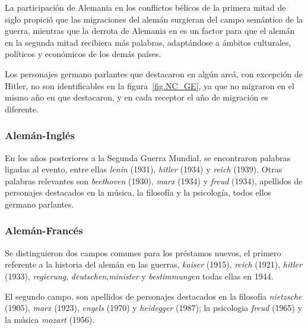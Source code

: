 La participación de Alemania en los conflictos bélicos de la primera mitad de siglo  propició que las migraciones del alemán surgieran del campo semántico de la guerra, mientras que la derrota de Alemania en es un factor para que el alemán en la segunda mitad  recibiera más palabras, adaptándose a ámbitos culturales, políticos y económicos de los demás países. 

Los personajes germano parlantes que destacaron en algún areá, con excepción de Hitler, no son identificables en la figura~\ref{fig.NC_GE}, ya que no migraron en el mismo año en que destacaron, y en cada receptor el año de migración es diferente. 


\subsubsection*{Alemán-Inglés}%

En los años posteriores a la Segunda Guerra Mundial, se encontraron palabras ligadas al evento, entre ellas \textit{lenin} (1931), \textit{hitler} (1934) y \textit{reich} (1939).  Otras palabras relevantes son \textit{beethoven} (1930), \textit{marx} (1934) y \textit{freud} (1934), apellidos de personajes destacados en la música, la filosofía y la psicología, todos ellos germano parlantes.


\subsubsection*{Alemán-Francés}%


Se distinguieron dos campos comunes para los préstamos nuevos,  el primero referente a la historia del alemán en las guerras, \textit{kaiser} (1915), \textit{reich} (1921), \textit{hitler} (1933),  \textit{regierung}, \textit{deutschen},\textit{minister} y  \textit{bestimmungen} todas ellas en 1944. %

El segundo campo, son apellidos de  personajes destacados en la filosofía \textit{nietzsche} (1905),  \textit{marx} (1923), \textit{engels} (1970) y \textit{heidegger} (1987); la psicologia \textit{freud} (1965)  y  la música \textit{mozart} (1956). 



